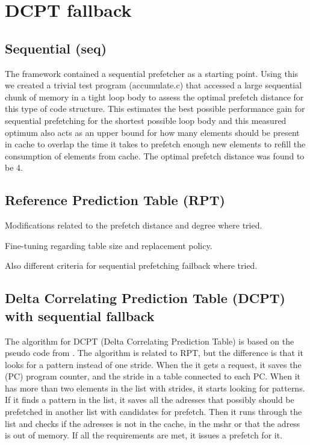 \documentclass[12pt,journal,compsoc]{IEEEtran}
\begin{document}
\section{DCPT fallback}
\subsection{Sequential (seq)}
The framework contained a sequential prefetcher as a starting point.
Using this we created a trivial test program (accumulate.c) that accessed
a large sequential chunk of memory in a tight loop body to assess the
optimal prefetch distance for this type of code structure.
This estimates the best possible performance gain for sequential
prefetching for the shortest possible loop body and this
measured optimum also acts as an upper bound for how many elements should
be present in cache to overlap the time it takes to prefetch enough new
elements to refill the consumption of elements from cache. The optimal
prefetch distance was found to be 4. %

\subsection{Reference Prediction Table (RPT)}
Modifications related to the prefetch distance and degree where tried.

Fine-tuning regarding table size and replacement policy.

Also different criteria for sequential prefetching failback where tried.


\subsection{Delta Correlating Prediction Table (DCPT) with sequential fallback}
The algorithm for DCPT (Delta Correlating Prediction Table) is based on the pseudo code from \cite{dcptpaper}.
The algorithm is related to RPT, but the difference is that it looks for a pattern instead of one stride.
When the it gets a request, it saves the (PC) program counter, and the stride in a table connected to each PC. When it has more than two elements in the list with strides, it starts looking for patterns.
If it finds a pattern in the list, it saves all the adresses that possibly should be prefetched in another list with candidates for prefetch.
Then it runs through the list and checks if the adresses is not in the cache, in the mshr or that the adress is out of memory. If all the requirements are met, it issues a prefetch for it.
\end{document}
